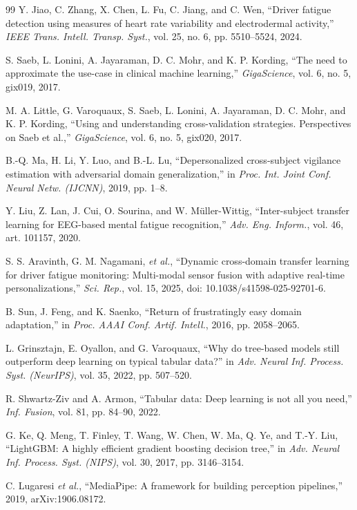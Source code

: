 \documentclass[journal]{IEEEtran}
\begin{document}
\begin{thebibliography}{99}
Y. Jiao, C. Zhang, X. Chen, L. Fu, C. Jiang, and C. Wen, ``Driver fatigue
detection using measures of heart rate variability and electrodermal
activity,'' \emph{IEEE Trans. Intell. Transp. Syst.}, vol. 25, no. 6,
pp. 5510--5524, 2024.

S. Saeb, L. Lonini, A. Jayaraman, D. C. Mohr, and K. P. Kording, ``The need
to approximate the use-case in clinical machine learning,'' \emph{GigaScience},
vol. 6, no. 5, gix019, 2017.

M. A. Little, G. Varoquaux, S. Saeb, L. Lonini, A. Jayaraman, D. C. Mohr, and
K. P. Kording, ``Using and understanding cross-validation strategies.
Perspectives on Saeb et al.,'' \emph{GigaScience}, vol. 6, no. 5, gix020,
2017.

B.-Q. Ma, H. Li, Y. Luo, and B.-L. Lu, ``Depersonalized cross-subject
vigilance estimation with adversarial domain generalization,'' in \emph{Proc.
Int. Joint Conf. Neural Netw. (IJCNN)}, 2019, pp. 1--8.

Y. Liu, Z. Lan, J. Cui, O. Sourina, and W. M\"uller-Wittig, ``Inter-subject
transfer learning for EEG-based mental fatigue recognition,'' \emph{Adv. Eng.
Inform.}, vol. 46, art. 101157, 2020.

S. S. Aravinth, G. M. Nagamani, \emph{et al.}, ``Dynamic cross-domain
transfer learning for driver fatigue monitoring: Multi-modal sensor fusion
with adaptive real-time personalizations,'' \emph{Sci. Rep.}, vol. 15, 2025,
doi: 10.1038/s41598-025-92701-6.

B. Sun, J. Feng, and K. Saenko, ``Return of frustratingly easy domain
adaptation,'' in \emph{Proc. AAAI Conf. Artif. Intell.}, 2016,
pp. 2058--2065.

L. Grinsztajn, E. Oyallon, and G. Varoquaux, ``Why do tree-based models still
outperform deep learning on typical tabular data?'' in \emph{Adv. Neural Inf.
Process. Syst. (NeurIPS)}, vol. 35, 2022, pp. 507--520.

R. Shwartz-Ziv and A. Armon, ``Tabular data: Deep learning is not all you
need,'' \emph{Inf. Fusion}, vol. 81, pp. 84--90, 2022.

G. Ke, Q. Meng, T. Finley, T. Wang, W. Chen, W. Ma, Q. Ye, and T.-Y. Liu,
``LightGBM: A highly efficient gradient boosting decision tree,'' in
\emph{Adv. Neural Inf. Process. Syst. (NIPS)}, vol. 30, 2017,
pp. 3146--3154.


C. Lugaresi \emph{et al.}, ``MediaPipe: A framework for building perception
pipelines,'' 2019, arXiv:1906.08172.

\end{thebibliography}
\end{document}
